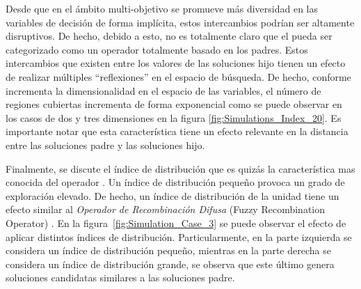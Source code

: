 %
Desde que en el ámbito multi-objetivo se promueve más diversidad en las variables de decisión de forma implícita, estos intercambios podrían ser altamente disruptivos.
%
De hecho, debido a esto, no es totalmente claro que el \SBX{} pueda ser categorizado como un operador totalmente basado en los padres.
%
Estos intercambios que existen entre los valores de las soluciones hijo tienen un efecto de realizar múltiples ``reflexiones'' en el espacio de búsqueda.
%
De hecho, conforme incrementa la dimensionalidad en el espacio de las variables, el número de regiones cubiertas incrementa de forma exponencial como se puede observar en los casos de dos y tres dimensiones en la figura \ref{fig:Simulations_Index_20}.
%
Es importante notar que esta característica tiene un efecto relevante en la distancia entre las soluciones padre y las soluciones hijo.

Finalmente, se discute el índice de distribución que es quizás la característica mas conocida del operador \SBX{}.
%
Un índice de distribución pequeño provoca un grado de exploración elevado.
%
De hecho, un índice de distribución de la unidad tiene un efecto similar al \textit{Operador de Recombinación Difusa} (Fuzzy Recombination Operator) \cite{voigt1995fuzzy}.
%
En la figura~\ref{fig:Simulation_Case_3} se puede observar el efecto de aplicar distintos índices de distribución.
%
Particularmente, en la parte izquierda se considera un índice de distribución pequeño, mientras en la parte derecha se considera un índice de distribución grande, se observa que este último genera soluciones candidatas similares a las soluciones padre.
%

